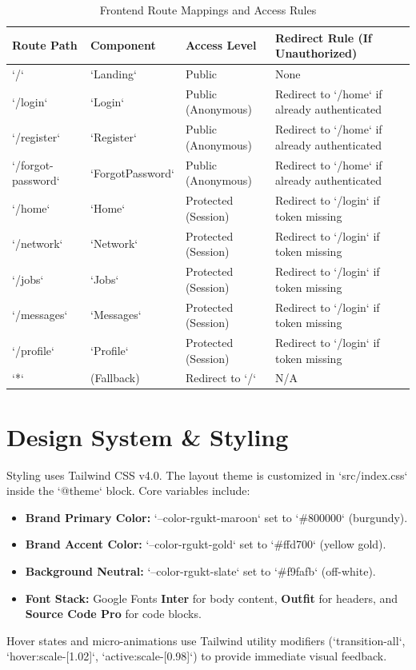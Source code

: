 \begin{table}[H]
    \centering
    \caption{Frontend Route Mappings and Access Rules}
    \label{tab:route_mappings}
    \begin{tabularx}{\textwidth}{l l l X}
        \toprule
        \textbf{Route Path} & \textbf{Component} & \textbf{Access Level} & \textbf{Redirect Rule (If Unauthorized)} \\
        \midrule
        `/` & `Landing` & Public & None \\
        `/login` & `Login` & Public (Anonymous) & Redirect to `/home` if already authenticated \\
        `/register` & `Register` & Public (Anonymous) & Redirect to `/home` if already authenticated \\
        `/forgot-password` & `ForgotPassword` & Public (Anonymous) & Redirect to `/home` if already authenticated \\
        `/home` & `Home` & Protected (Session) & Redirect to `/login` if token missing \\
        `/network` & `Network` & Protected (Session) & Redirect to `/login` if token missing \\
        `/jobs` & `Jobs` & Protected (Session) & Redirect to `/login` if token missing \\
        `/messages` & `Messages` & Protected (Session) & Redirect to `/login` if token missing \\
        `/profile` & `Profile` & Protected (Session) & Redirect to `/login` if token missing \\
        `*` & (Fallback) & Redirect to `/` & N/A \\
        \bottomrule
    \end{tabularx}
\end{table}

\section{Design System \& Styling}
Styling uses Tailwind CSS v4.0. The layout theme is customized in `src/index.css` inside the `@theme` block. Core variables include:
\begin{itemize}
    \item \textbf{Brand Primary Color:} `--color-rgukt-maroon` set to `\#800000` (burgundy).
    \item \textbf{Brand Accent Color:} `--color-rgukt-gold` set to `\#ffd700` (yellow gold).
    \item \textbf{Background Neutral:} `--color-rgukt-slate` set to `\#f9fafb` (off-white).
    \item \textbf{Font Stack:} Google Fonts \textbf{Inter} for body content, \textbf{Outfit} for headers, and \textbf{Source Code Pro} for code blocks.
\end{itemize}
Hover states and micro-animations use Tailwind utility modifiers (`transition-all`, `hover:scale-[1.02]`, `active:scale-[0.98]`) to provide immediate visual feedback.
